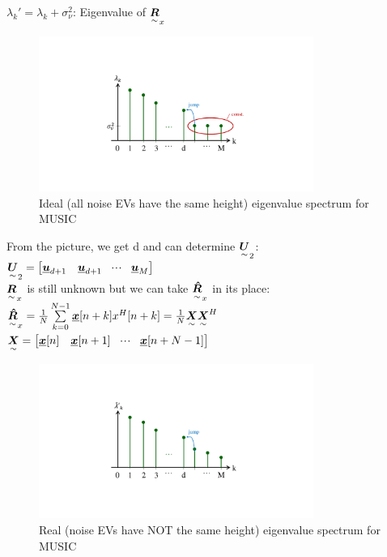 $\lambda_k'=\lambda_k+\sigma_\nu^2$: Eigenvalue of $\underset{\sim}{\boldsymbol {R}}_x$

\begin{figure}[H]
	\centering
		\includegraphics[trim =5cm 5cm 5cm 4cm, clip, width=0.80\textwidth]{graphics/Ideal_MUSIC_eigenvalues.pdf}
	\caption{Ideal (all noise EVs have the same height) eigenvalue spectrum for MUSIC}
	\label{fig:Ideal_MUSIC_eigenvalues}
\end{figure}

From the picture, we get d and can determine $\underset{\sim}{\boldsymbol {U}}_2$:\\
$\underset{\sim}{\boldsymbol {U}}_2=\begin{bmatrix} \underline{\boldsymbol {u}}_{d+1}&\underline{\boldsymbol {u}}_{d+1}&\!\cdot \!\cdot\!\cdot\!&\underline{\boldsymbol {u}}_{M} \end{bmatrix}$\\
$\underset{\sim}{\boldsymbol {R}}_x$ is still unknown but we can take $\underset{\sim}{\boldsymbol {\hat{R}}}_x$ in its place:\\
$\underset{\sim}{\boldsymbol {\hat{R}}}_x=\frac{1}{N}\sum\limits_{k=0}^{N-1}\underline{\boldsymbol {x}}[n+k]x^H[n+k]=\frac{1}{N}\underset{\sim}{\boldsymbol {X}}\underset{\sim}{\boldsymbol {X}}^H$\\
$\underset{\sim}{\boldsymbol {X}}=\begin{bmatrix} \underline{\boldsymbol {x}}[n]&\underline{\boldsymbol {x}}[n+1]&\!\cdot \!\cdot\!\cdot\!&\underline{\boldsymbol {x}}[n+N-1] \end{bmatrix}$\\

\begin{figure}[H]
	\centering
		\includegraphics[trim =5cm 5cm 5cm 4cm, clip, width=0.80\textwidth]{graphics/Real_MUSIC_eigenvalues.pdf}
	\caption{Real (noise EVs have NOT the same height) eigenvalue spectrum for MUSIC}
	\label{fig:Real_MUSIC_eigenvalues}
\end{figure}

